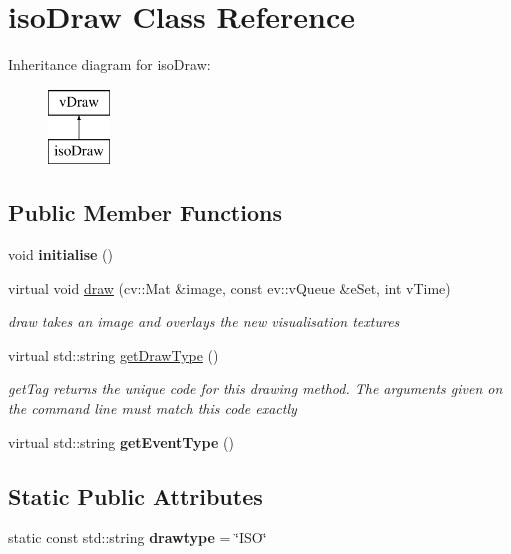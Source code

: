 \hypertarget{classisoDraw}{}\section{iso\+Draw Class Reference}
\label{classisoDraw}
Inheritance diagram for iso\+Draw\+:\begin{figure}[H]
\begin{center}
\leavevmode
\includegraphics[height=2.000000cm]{classisoDraw}
\end{center}
\end{figure}
\subsection*{Public Member Functions}
\begin{DoxyCompactItemize}
\item 
void {\bfseries initialise} ()\hypertarget{classisoDraw_a3f77f51dbc01edb801d2c0f2a2c88fbf}{}\label{classisoDraw_a3f77f51dbc01edb801d2c0f2a2c88fbf}

\item 
virtual void \hyperlink{classisoDraw_a20877ef82deb90f2bdea5a3225fc447d}{draw} (cv\+::\+Mat \&image, const ev\+::v\+Queue \&e\+Set, int v\+Time)
\begin{DoxyCompactList}\small\item\em draw takes an image and overlays the new visualisation textures \end{DoxyCompactList}\item 
virtual std\+::string \hyperlink{classisoDraw_a8ff12e0ab9d2b65a16afc175c7cc59c1}{get\+Draw\+Type} ()
\begin{DoxyCompactList}\small\item\em get\+Tag returns the unique code for this drawing method. The arguments given on the command line must match this code exactly \end{DoxyCompactList}\item 
virtual std\+::string {\bfseries get\+Event\+Type} ()\hypertarget{classisoDraw_ade662b244b8de886f9f80c8928cc849b}{}\label{classisoDraw_ade662b244b8de886f9f80c8928cc849b}

\end{DoxyCompactItemize}
\subsection*{Static Public Attributes}
\begin{DoxyCompactItemize}
\item 
static const std\+::string {\bfseries drawtype} = \char`\"{}I\+SO\char`\"{}\hypertarget{classisoDraw_aa40d55a262ce4581da5391cf22cb39fd}{}\label{classisoDraw_aa40d55a262ce4581da5391cf22cb39fd}

\end{DoxyCompactItemize}
